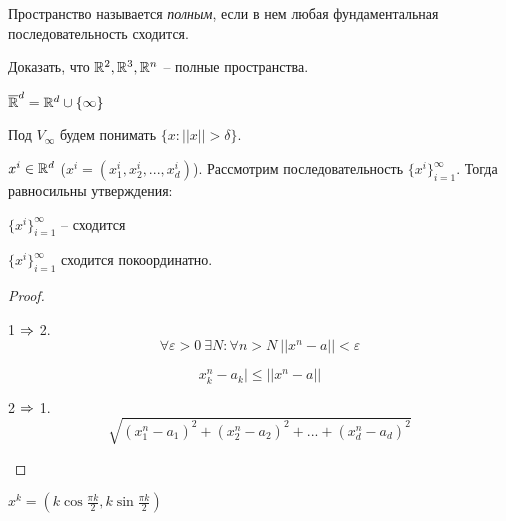     \begin{Def}
        Пространство называется \textit{полным}, если в нем любая фундаментальная последовательность сходится.
    \end{Def}

    \begin{Ex}
        Доказать, что $\mathbb{R}^2, \mathbb{R}^3, \mathbb{R}^n$ -- полные пространства.
    \end{Ex}

    \begin{notation}
        $\overline{\mathbb{R}}^d = \mathbb{R}^d \cup \{\infty\}$ 
    \end{notation}

    \begin{Rem}
        Под $V_\infty$ будем понимать $\{x : ||x|| > \delta\}$. 
    \end{Rem}    
    
    \begin{Thm}
        $x^i \in \mathbb{R}^d$ ($x^i = (x_1^i, x_2^i, ..., x_d^i)$). Рассмотрим последовательность $\{x^i\}_{i = 1}^\infty$. Тогда 
        равносильны утверждения: 

        \begin{MyList}
            \item $\{x^i\}_{i = 1}^\infty$ -- сходится
            \item $\{x^i\}_{i = 1}^\infty$ сходится покоординатно.  
        \end{MyList}
    \end{Thm}

    \begin{proof}
        \begin{MyList}
            \item[] 1 $\Rightarrow$ 2.
            \[\forall \varepsilon > 0 \ \exists N : \forall n > N \ ||x^n - a|| < \varepsilon\]

            \[x_k^n - a_k| \leqslant ||x^n - a||\]

            \item[] 2 $\Rightarrow$ 1. 
            \[\sqrt{(x_1^n - a_1)^2 + (x_2^n - a_2)^2 + ... + (x_d^n - a_d)^2}\]
        \end{MyList}
    \end{proof}

    \begin{Rem}
        $x^k = \left(k \cos \frac{\pi k}{2}, k \sin \frac{\pi k}{2}\right)$ 
    \end{Rem}

    
